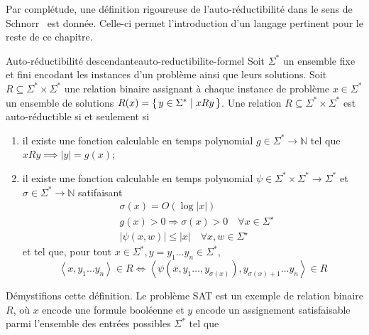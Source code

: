 
Par complétude, une définition rigoureuse de l'auto-réductibilité dans le sens de Schnorr~\cite{schnorrOptimalAlgorithmsSelfReducible1976} est donnée. Celle-ci permet l'introduction d'un langage pertinent pour le reste de ce chapitre.

\begin{maindefinition}{Auto-réductibilité descendante}{auto-reductibilite-formel}
    Soit $\Sigma^{*}$ un ensemble fixe et fini encodant les instances d'un problème ainsi que leurs solutions. Soit $R \subseteq \Sigma^{*} \times \Sigma^{*}$ une relation binaire assignant à chaque instance de problème $x \in \Sigma^{*}$ un ensemble de solutions $R(x) = \set{ y \in \Sigma^{*} \mid xRy }$. Une relation $R \subseteq \Sigma^{*} \times \Sigma^{*}$ est auto-réductible si et seulement si
    \begin{enumerate}
        \item il existe une fonction calculable en temps polynomial $g \in \Sigma^{*} \to \mathbb{N}$ tel que $xRy \implies \lvert y \rvert = g(x)$;
        \item il existe une fonction calculable en temps polynomial $\psi \in \Sigma^{*} \times \Sigma^{*} \to \Sigma^{*}$ et $\sigma \in \Sigma^{*} \to \mathbb{N}$ satifaisant
        \begin{align*}
            & \sigma(x)=O(\log |x|) \\
            & g(x)>0 \Rightarrow \sigma(x)>0 \quad \forall x \in \Sigma^{\star} \\
            & |\psi(x, w)| \leqslant|x| \quad \forall x, w \in \Sigma^{\star}
        \end{align*}
        et tel que, pour tout $x \in \Sigma^{*}, y=y_1 \ldots y_n \in \Sigma^{*}$, 
        \begin{equation*}
            \left\langle x, y_1 \ldots y_n \right\rangle \in R \Leftrightarrow \left\langle \psi \left( x, y_1 \ldots, y_{\sigma(x)} \right), y_{\sigma(x)+1} \ldots y_n \right\rangle \in R
        \end{equation*}
    \end{enumerate}
\end{maindefinition}

Démystifions cette définition. Le problème SAT est un exemple de relation binaire $R$, où $x$ encode une formule booléenne et $y$ encode un assignement satisfaisable parmi l'ensemble des entrées possibles $\Sigma^{*}$ tel que

